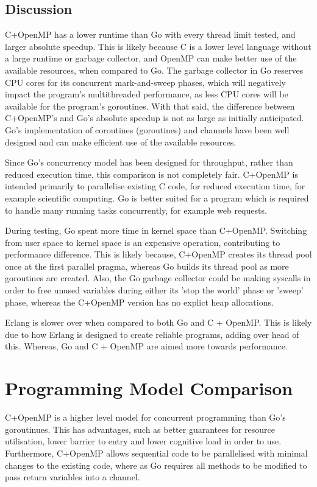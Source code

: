 \documentclass[11pt,a4paper,titlepage]{article}
\begin{document}
\FloatBarrier
\subsection{Discussion}
C+OpenMP has a lower runtime than Go with every thread limit tested, and larger absolute speedup.
This is likely because C is a lower level language without a large runtime or garbage collector, and OpenMP can make better use of the available resources, when compared to Go.
The garbage collector in Go reserves CPU cores for its concurrent mark-and-sweep phases, which will negatively impact the program's multithreaded performance, as less CPU cores will be available for the program's goroutines.
With that said, the difference between C+OpenMP's and Go's absolute speedup is not as large as initially anticipated.
Go's implementation of coroutines (goroutines) and channels have been well designed and can make efficient use of the available resources.

Since Go's concurrency model has been designed for throughput, rather than reduced execution time, this comparison is not completely fair.
C+OpenMP is intended primarily to parallelise existing C code, for reduced execution time, for example scientific computing.
Go is better suited for a program which is required to handle many running tasks concurrently, for example web requests.

During testing, Go spent more time in kernel space than C+OpenMP.
Switching from user space to kernel space is an expensive operation, contributing to performance difference.
This is likely because, C+OpenMP creates its thread pool once at the first parallel pragma, whereas Go builds its thread pool as more goroutines are created.
Also, the Go garbage collector could be making syscalls in order to free unused variables during either its 'stop the world' phase or 'sweep' phase, whereas the C+OpenMP version has no explict heap allocations.

Erlang is slower over when compared to both Go and C + OpenMP.
This is likely due to how Erlang is designed to create reliable programs, adding over head of this.
Whereas, Go and C + OpenMP are aimed more towards performance.

\section{Programming Model Comparison}
C+OpenMP is a higher level model for concurrent programming than Go's goroutinues.
This has advantages, such as better guarantees for resource utilisation, lower barrier to entry and lower cognitive load in order to use.
Furthermore, C+OpenMP allows sequential code to be parallelised with minimal changes to the existing code, where as Go requires all methods to be modified to pass return variables into a channel.
\end{document}
